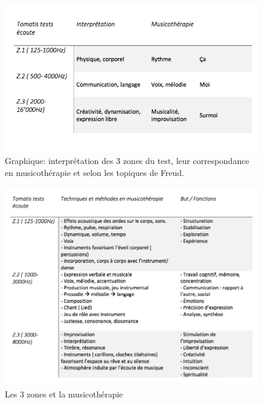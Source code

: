 




\begin{figure}
	\centering
	\includegraphics[width=1.1\linewidth]{images/testinterpmusico}
	\caption[ L'interprétation des 3 zones et leur correspondance
	en musicothérapie]{Graphique: interprétation des 3 zones du
		test, leur correspondance en musicothérapie et selon les
		topiques de Freud.}
	
	\label{graphiquecolonnetestmusico}
\end{figure}
 \clearpage
\begin{figure}[tbh]
	\centering
	\includegraphics[width=1.2\linewidth]{images/testtechnmethbut}
	\caption[Zones du test avec la musicothérapie]{Les 3
		zones et la musicothérapie}
	
	\label{testbutetfonction}
\end{figure}

